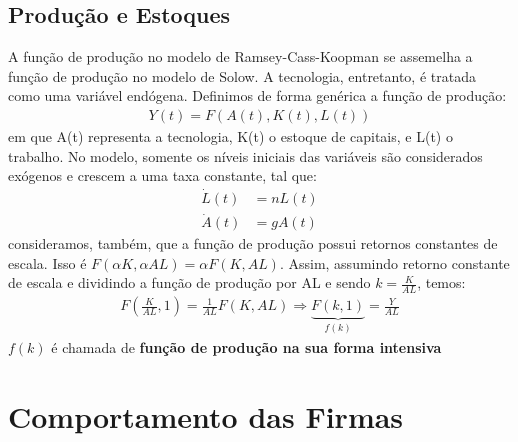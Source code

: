 \documentclass[11pt,a4paper]{article}
\begin{document}
\subsection{Produção e Estoques}

A função de produção no modelo de Ramsey-Cass-Koopman se assemelha a função de produção no modelo de Solow. A tecnologia, entretanto, é tratada como uma variável endógena. Definimos de forma genérica a função de produção:
\begin{align*}
Y(t) = F(A(t), K(t), L(t))
\end{align*}
\noindent
em que A(t) representa a tecnologia, K(t) o estoque de capitais, e L(t) o trabalho. No modelo, somente os níveis iniciais das variáveis são considerados exógenos e crescem a uma taxa constante, tal que:
\begin{align*}
\dot{L}(t) &= nL(t) \\
\dot{A}(t) &= gA(t)
\end{align*} 
\noindent
consideramos, também, que a função de produção possui retornos constantes de escala. Isso é $F(\alpha K, \alpha AL)= \alpha F(K,AL)$. Assim, assumindo retorno constante de escala e dividindo a função de produção por AL e sendo $k = \frac{K}{AL}$, temos:
\begin{align*}
F\left(\frac{K}{AL}, 1\right) = \frac{1}{AL}F(K, AL) \Rightarrow \underbrace{F(k, 1)}_{f(k)} = \frac{Y}{AL}
\end{align*}
\noindent
$f(k)$ é chamada de \textbf{função de produção na sua forma intensiva}

\section{Comportamento das Firmas}
\end{document}

